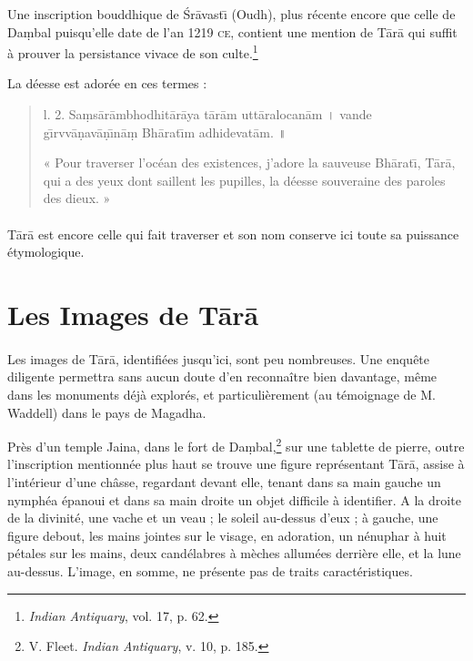 \documentclass[a4paper, 11pt, oneside, french]{article}
\begin{document}
Une inscription bouddhique de \'{S}r\={a}vast\={\i} (Oudh), plus récente encore que celle de Da\d{m}bal puisqu'elle date de l'an 1219 \textsc{ce}, contient une mention de T\={a}r\={a} qui suffit à prouver la persistance vivace de son culte.\footnote{\emph{Indian Antiquary}, vol. 17, p. 62.}

La déesse est adorée en ces termes :
\begin{quotation}
l. 2. Sa\d{m}s\={a}r\={a}mbhodhit\={a}r\={a}ya t\={a}r\={a}m utt\={a}ralocan\={a}m \texthindi{।} vande g\={\i}rvv\={a}\d{n}av\={a}\d{n}\={\i}n\={a}\d{m} Bh\={a}rat\={\i}m adhidevat\={a}m. \texthindi{॥}

\bigskip

« Pour traverser l'océan des existences, j'adore la sauveuse Bh\={a}rat\={\i}, T\={a}r\={a}, qui a des yeux dont saillent les pupilles, la déesse souveraine des paroles des dieux. »
\end{quotation}
\paragraph{}
T\={a}r\={a} est encore celle qui fait traverser et son nom conserve ici toute sa puissance étymologique.
\clearpage
\section{Les Images de T\={a}r\={a}}
\paragraph{}
Les images de T\={a}r\={a}, identifiées jusqu'ici, sont peu nombreuses. Une enquête diligente permettra sans aucun doute d'en reconnaître bien davantage, même dans les monuments déjà explorés, et particulièrement (au témoignage de M. Waddell) dans le pays de Magadha.

Près d'un temple Jaina, dans le fort de Da\d{m}bal,\footnote{V. Fleet. \emph{Indian Antiquary}, v. 10, p. 185.} sur une tablette de pierre, outre l'inscription mentionnée plus haut se trouve une figure représentant T\={a}r\={a}, assise à l'intérieur d'une châsse, regardant devant elle, tenant dans sa main gauche un nymphéa épanoui et dans sa main droite un objet difficile à identifier. A la droite de la divinité, une vache et un veau ; le soleil au-dessus d'eux ; à gauche, une figure debout, les mains jointes sur le visage, en adoration, un nénuphar à huit pétales sur les mains, deux candélabres à mèches allumées derrière elle, et la lune au-dessus. L'image, en somme, ne présente pas de traits caractéristiques.
\end{document}
